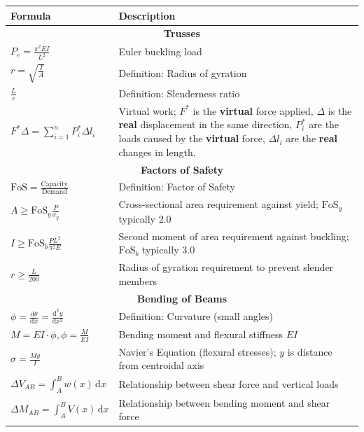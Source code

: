 \documentclass[twocolumn]{article}
\newcommand{\diff}[2]{\frac{\mathrm{d}#1}{\mathrm{d}#2}}
\newcommand{\diffn}[3]{\frac{\mathrm{d}^{#1}#2}{\mathrm{d}#3^{#1}}}
\newcommand{\dd}[1]{\mathrm{d}#1}
\newcommand{\formulasection}[1]{\multicolumn{2}{c}{\textbf{#1}}}
\begin{document}
\begin{tabularx}{\linewidth}{l X}
    Formula & Description \\
    \hline
    \hline
    \formulasection{Trusses} \\
    \(P_e = \frac{\pi^2 EI}{L^2}\) & Euler buckling load \\
    \rule{0pt}{4ex}\(r = \sqrt{\frac{I}{A}}\) & Definition: Radius of gyration \\
    \(\frac{L}{r}\) & Definition: Slenderness ratio \\
    \(F^*\Delta = \sum_{i = 1}^n P_i^*\Delta l_i\) & Virtual work; \(F^*\) is the \textbf{virtual} force applied,
        \(\Delta\) is the \textbf{real} displacement in the same direction, \(P_i^*\) are the loads caused by the
        \textbf{virtual} force, \(\Delta l_i\) are the \textbf{real} changes in length. \\
    \hline
    \formulasection{Factors of Safety} \\
    \(\text{FoS} = \frac{\text{Capacity}}{\text{Demand}}\) & Definition: Factor of Safety \\
    \rule{0pt}{4ex}\(A \geq \text{FoS}_y\frac{P}{\sigma_y}\) & Cross-sectional area requirement against yield;
        \(\text{FoS}_y\) typically \(2.0\) \\
    \(I \geq \text{FoS}_b\frac{PL^2}{\pi^2 E}\) & Second moment of area requirement against buckling; \(\text{FoS}_b\)
        typically \(3.0\) \\
    \(r \geq \frac{L}{200}\) & Radius of gyration requirement to prevent slender members \\
    \hline
    \formulasection{Bending of Beams} \\
    \(\phi = \diff{\theta}{x} = \diffn{2}{y}{x}\) & Definition: Curvature (small angles) \\
    \(M = EI \cdot \phi, \phi = \frac{M}{EI}\) & Bending moment and flexural stiffness \(EI\) \\
    \(\sigma = \frac{My}{I}\) & Navier's Equation (flexural stresses); \(y\) is distance from centroidal axis \\
    \(\Delta V_{AB} = \int_A^B w(x)\,\dd x\) & Relationship between shear force and vertical loads \\
    \(\Delta M_{AB} = \int_A^B V(x)\,\dd x\) & Relationship between bending moment and shear force \\

\end{tabularx}
\end{document}
